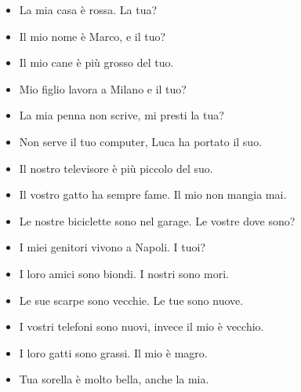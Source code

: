 \documentclass[letter,11pt]{article}
\begin{document}
\vskip 0.5in
\begin{multicols}{2}
\begin{itemize}
    \item La mia casa è rossa. La tua?
    \item Il mio nome è Marco, e il tuo?
    \item Il mio cane è più grosso del tuo.
    \item Mio figlio lavora a Milano e il tuo?
    \item La mia penna non scrive, mi presti la tua?
    \item Non serve il tuo computer, Luca ha portato il suo.
    \item Il nostro televisore è più piccolo del suo.
    \item Il vostro gatto ha sempre fame. Il mio non mangia mai.
    \item Le nostre biciclette sono nel garage. Le vostre dove sono?
    \item I miei genitori vivono a Napoli. I tuoi?
    \item I loro amici sono biondi. I nostri sono mori.
    \item Le sue scarpe sono vecchie. Le tue sono nuove.
    \item I vostri telefoni sono nuovi, invece il mio è vecchio.
    \item I loro gatti sono grassi. Il mio è magro.
    \item Tua sorella è molto bella, anche la mia.


\end{itemize}
\end{multicols}
\end{document}
